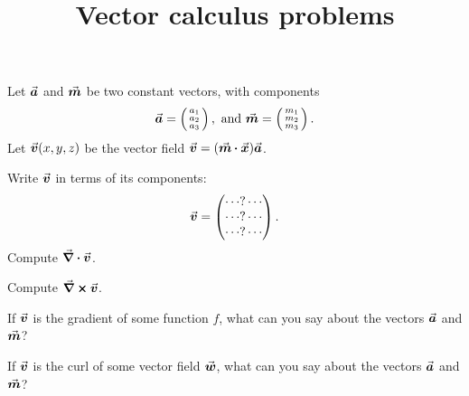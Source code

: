 \documentclass{amsart}
\begin{document}
\title{Vector calculus problems}
\maketitle
\problem \label{prb:05derivs-of-a-times-m-dot-x} %
Let $\va$ and $\vm$ be two constant vectors, with components
\[
\va = \tvek a_1\\a_2\\a_3\ttor, \text{ and }
\vm = \tvek m_1\\m_2\\m_3\ttor.
\]
Let $\vv(x, y, z)$ be the vector field $\vv = (\vm\dpp\vx)\va$.

\subprob Write $\vv$ in terms of its components:
\[
\vv = \vek \cdots?\cdots \\ \cdots?\cdots \\ \cdots?\cdots \tor.
\]
\subprob Compute $\nab\dpp \vv$. %

\subprob Compute $\nab \cp \vv$. %

\subprob If $\vv$ is the gradient of some function $f$, %
what can you say about the vectors $\va$ and $\vm$?

\subprob If $\vv$ is the curl of some vector field $\vw$, %
what can you say about the vectors $\va$ and $\vm$?
\end{document}
